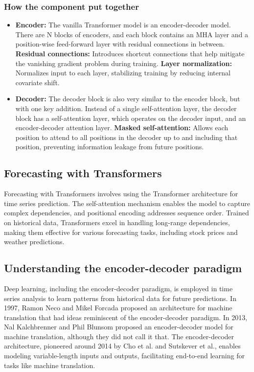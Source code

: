 \documentclass{article}
\begin{document}
\subsubsection{How the component put together}
\begin{itemize}
    \item \textbf{Encoder: }The vanilla Transformer model is an encoder-decoder model. There are N blocks of encoders, and each block contains an MHA layer and a position-wise feed-forward layer with residual connections in between.
    \subitem \textbf{Residual connections: }Introduces shortcut connections that help mitigate the vanishing gradient problem during training.
    \subitem \textbf{Layer normalization: }Normalizes input to each layer, stabilizing training by reducing internal covariate shift.
    \item \textbf{Decoder: }The decoder block is also very similar to the encoder block, but with one key addition. Instead of a single self-attention layer, the decoder block has a self-attention layer, which operates on the decoder input, and an encoder-decoder attention layer.  
    \subitem \textbf{Masked self-attention: }Allows each position to attend to all positions in the decoder up to and including that position, preventing information leakage from future positions.
\end{itemize}

\subsection{Forecasting with Transformers}
Forecasting with Transformers involves using the Transformer architecture for time series prediction. The self-attention mechanism enables the model to capture complex dependencies, and positional encoding addresses sequence order. Trained on historical data, Transformers excel in handling long-range dependencies, making them effective for various forecasting tasks, including stock prices and weather predictions.


\subsection{Understanding the encoder-decoder paradigm}
Deep learning, including the encoder-decoder paradigm, is employed in time series analysis to learn patterns from historical data for future predictions. In 1997, Ramon Neco and Mikel Forcada proposed an architecture for machine translation that had ideas reminiscent of the encoder-decoder paradigm. In 2013, Nal Kalchbrenner and Phil Blunsom proposed an encoder-decoder model for machine translation, although they did not call it that. The encoder-decoder architecture, pioneered around 2014 by Cho et al. and Sutskever et al., enables modeling variable-length inputs and outputs, facilitating end-to-end learning for tasks like machine translation.
\end{document}
